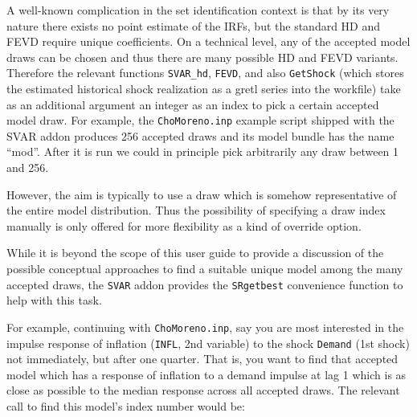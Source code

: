 \documentclass[a4paper,10pt]{article}
\newcounter{script}[section]
\begin{document}
A well-known complication in the set identification context is that by its very 
nature there exists no point estimate of the IRFs, but the standard HD and FEVD 
require unique coefficients. On a technical level, any of the accepted model draws
can be chosen and thus there are many possible HD and FEVD variants. Therefore
the relevant functions \texttt{SVAR\_hd}, \texttt{FEVD}, and also \texttt{GetShock}
(which stores the estimated historical shock realization as a gretl series into the
workfile) take as an additional argument an integer as an index to pick a certain
accepted model draw.
For example, the \texttt{ChoMoreno.inp} example script shipped with the SVAR 
addon produces 256 accepted draws and its model bundle has the name ``mod''.
After it is run we could in principle pick arbitrarily any draw between 1 and 256.







However, the aim is typically to use a draw which is somehow representative of the entire 
model distribution. Thus the possibility of specifying a draw index manually is only offered for 
more flexibility as a kind of override option. 

While it is beyond the scope of this user guide to provide a discussion of the possible conceptual 
approaches to find a suitable unique model among the many accepted draws, the \texttt{SVAR}
addon provides the \texttt{SRgetbest} convenience function to help with this task.

For example, continuing with \texttt{ChoMoreno.inp}, say you are most interested in the 
impulse response of inflation (\texttt{INFL}, 2nd variable) to the shock \texttt{Demand} 
(1st shock) not immediately, but after one quarter. 
That is, you want to find that accepted model which has a 
response of inflation to a demand impulse at lag 1 which is as close as 
possible to the median response across all accepted draws. 
The relevant call to find this model's index number would be:
\end{document}

